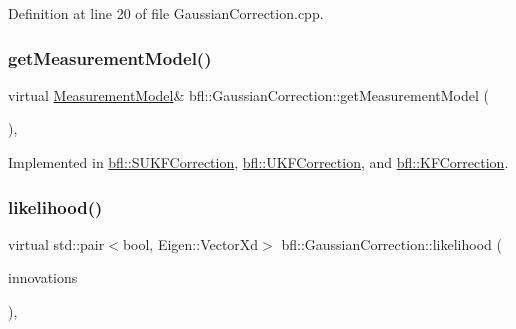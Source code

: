 Definition at line 20 of file Gaussian\+Correction.\+cpp.

\mbox{\label{classbfl_1_1GaussianCorrection_af609a22d84cc17a7337486c339ef30c3}} 
\subsubsection{\texorpdfstring{get\+Measurement\+Model()}{getMeasurementModel()}}
{\footnotesize\ttfamily virtual \mbox{\hyperlink{classbfl_1_1MeasurementModel}{Measurement\+Model}}\& bfl\+::\+Gaussian\+Correction\+::get\+Measurement\+Model (\begin{DoxyParamCaption}{ }\end{DoxyParamCaption})\hspace{0.3cm}{\ttfamily [protected]}, {}}



Implemented in \mbox{\hyperlink{classbfl_1_1SUKFCorrection_a499e3b64cc82faa71227e9ed47fc78b8}{bfl\+::\+S\+U\+K\+F\+Correction}}, \mbox{\hyperlink{classbfl_1_1UKFCorrection_aa201d96ffc7b94f2ea87927420c8821c}{bfl\+::\+U\+K\+F\+Correction}}, and \mbox{\hyperlink{classbfl_1_1KFCorrection_a71faf84180752e4e31b4eaa5db1c18d1}{bfl\+::\+K\+F\+Correction}}.

\mbox{\label{classbfl_1_1GaussianCorrection_a08e227b697ffbaf97c85fb4b17c99fd4}} 
\subsubsection{\texorpdfstring{likelihood()}{likelihood()}}
{\footnotesize\ttfamily virtual std\+::pair$<$bool, Eigen\+::\+Vector\+Xd$>$ bfl\+::\+Gaussian\+Correction\+::likelihood (\begin{DoxyParamCaption}\item[{const Eigen\+::\+Ref$<$ const Eigen\+::\+Matrix\+Xd $>$ \&}]{innovations }\end{DoxyParamCaption})\hspace{0.3cm}{\ttfamily [protected]}, {}}



